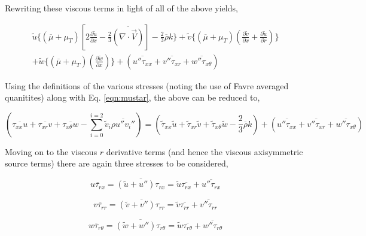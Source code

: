 	Rewriting these viscous terms in light of all of the above yields,

\begin{displaymath}
	\begin{array}{c}
	\tilde u \Big\{(\overline \mu + \mu_T)[2\frac{\partial \tilde u}{\partial x} -\frac{2}{3}
	\overline{(\nabla \cdot \vec{V})}] -\frac{2}{3}\overline{\rho} k \Big\} +
	\tilde v \Big\{(\overline \mu + \mu_T)(\frac{\partial \tilde v}{\partial x} + \frac{\partial \tilde u}
	{\partial r}) \Big\} 
	\\
	+ \tilde w \Big\{(\overline{\mu} + \mu_T)(\frac{\partial \tilde w}{\partial x})
	\Big\} + (\overline{u''\tau_{xx}} + \overline{v''\tau_{xr}} + \overline{w''\tau_{x\theta}})	
	\end{array}
\end{displaymath}

	Using the definitions of the various stresses (noting the use of Favre averaged quanitites) along with 
Eq. \ref{eqn:mustar}, the above can be reduced to,

\begin{equation}
	(\overline{\tau_{xx}u} + \overline{\tau_{xr}v} + \overline{\tau_{x\theta}w}
	- \sum_{i=0}^{i=2}\tilde v_i \overline{\rho u'' v_i''}) = (\tilde \tau_{xx} \tilde u + 
	\tilde \tau_{xr} \tilde v + \tilde \tau_{x\theta} \tilde w -\frac{2}{3}\overline{\rho}k)
	 + (\overline{u''\tau_{xx}} + \overline{v''\tau_{xr}} + \overline{w''\tau_{x\theta}})
\label{eqn:enerxvisturb}
\end{equation}

	Moving on to the viscous $r$ derivative terms (and hence the viscous axisymmetric source terms)
there are again three stresses to be considered,

\begin{displaymath}
	\overline{u \tau_{rx}} = \overline{(\tilde u + u'') \tau_{rx}} = \tilde u \overline{\tau_{rx}} + 
	\overline{u'' \tau_{rx}}
\end{displaymath}

\begin{displaymath}
	\overline{v \tau_{rr}} = \overline{(\tilde v + v'') \tau_{rr}} = \tilde v \overline{\tau_{rr}} + 
	\overline{v'' \tau_{rr}}
\end{displaymath}

\begin{displaymath}
	\overline{w \tau_{r\theta}} = \overline{(\tilde w + w'') \tau_{r\theta}} = \tilde w \overline{\tau_{r\theta}} + 
	\overline{w'' \tau_{r\theta}}
\end{displaymath}

